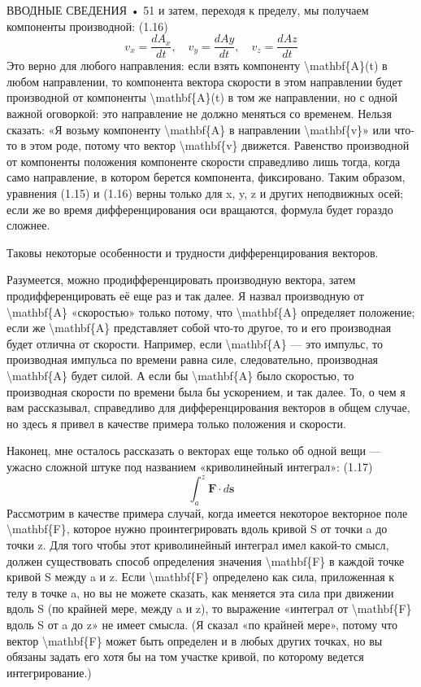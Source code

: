 \documentclass[10pt,oneside]{article}
\newcommand{\TipsSubsection}[1]{\par\vspace{6bp}{\normalsize\bfseries #1\par}\vspace{2bp}}
\begin{document}
ВВОДНЫЕ СВЕДЕНИЯ • 51 и затем, переходя к пределу, мы получаем компоненты производной: (1.16) \[v_x = \frac{dA_x}{dt}, \quad v_y = \frac{dAy}{dt}, \quad v_z = \frac{dAz}{dt}\] Это верно для любого направления: если взять компоненту \textbackslash{}mathbf\{A\}(t) в любом направлении, то компонента вектора скорости в этом направлении будет производной от компоненты \textbackslash{}mathbf\{A\}(t) в том же направлении, но с одной важной оговоркой: это направление не должно меняться со временем. Нельзя сказать: «Я возьму компоненту \textbackslash{}mathbf\{A\} в направлении \textbackslash{}mathbf\{v\}» или что-то в этом роде, потому что вектор \textbackslash{}mathbf\{v\} движется. Равенство производной от компоненты положения компоненте скорости справедливо лишь тогда, когда само направление, в котором берется компонента, фиксировано. Таким образом, уравнения (1.15) и (1.16) верны только для x, y, z и других неподвижных осей; если же во время дифференцирования оси вращаются, формула будет гораздо сложнее.\par

Таковы некоторые особенности и трудности дифференцирования векторов.\par

Разумеется, можно продифференцировать производную вектора, затем продифференцировать её еще раз и так далее. Я назвал производную от \textbackslash{}mathbf\{A\} «скоростью» только потому, что \textbackslash{}mathbf\{A\} определяет положение; если же \textbackslash{}mathbf\{A\} представляет собой что-то другое, то и его производная будет отлична от скорости. Например, если \textbackslash{}mathbf\{A\} --- это импульс, то производная импульса по времени равна силе, следовательно, производная \textbackslash{}mathbf\{A\} будет силой. А если бы \textbackslash{}mathbf\{A\} было скоростью, то производная скорости по времени была бы ускорением, и так далее. То, о чем я вам рассказывал, справедливо для дифференцирования векторов в общем случае, но здесь я привел в качестве примера только положения и скорости.\par

\TipsSubsection{1-8 Криволинейные интегралы}

Наконец, мне осталось рассказать о векторах еще только об одной вещи --- ужасно сложной штуке под названием «криволинейный интеграл»: (1.17) \[\int_a^z \mathbf{F} \cdot d\mathbf{s}\] Рассмотрим в качестве примера случай, когда имеется некоторое векторное поле \textbackslash{}mathbf\{F\}, которое нужно проинтегрировать вдоль кривой S от точки a до точки z. Для того чтобы этот криволинейный интеграл имел какой-то смысл, должен существовать способ определения значения \textbackslash{}mathbf\{F\} в каждой точке кривой S между a и z. Если \textbackslash{}mathbf\{F\} определено как сила, приложенная к телу в точке a, но вы не можете сказать, как меняется эта сила при движении вдоль S (по крайней мере, между a и z), то выражение «интеграл от \textbackslash{}mathbf\{F\} вдоль S от a до z» не имеет смысла. (Я сказал «по крайней мере», потому что вектор \textbackslash{}mathbf\{F\} может быть определен и в любых других точках, но вы обязаны задать его хотя бы на том участке кривой, по которому ведется интегрирование.)\par
\end{document}
